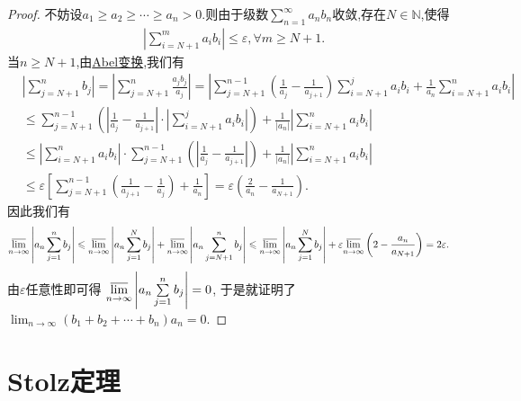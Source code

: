 \documentclass[lang=cn,newtx,10pt,scheme=chinese]{elegantbook}
\begin{document}
\begin{proof}
不妨设\(a_1 \geqslant a_2 \geqslant \cdots \geqslant a_n > 0\).则由于级数\(\sum\limits_{n = 1}^{\infty} a_n b_n\)收敛,存在\(N \in \mathbb{N}\),使得
\begin{align*}
   \left|\sum\limits_{i = N + 1}^{m} a_i b_i\right| \leqslant \varepsilon, \forall m \geqslant N + 1.
\end{align*}
当\(n \geqslant N + 1\),由\hyperref[theorem:Abel变换]{Abel变换},我们有
\begin{align*}
&\left|\sum\limits_{j = N + 1}^{n} b_j\right| = \left|\sum\limits_{j = N + 1}^{n} \frac{a_j b_j}{a_j}\right|
= \left|\sum\limits_{j = N + 1}^{n - 1} \left(\frac{1}{a_j} - \frac{1}{a_{j + 1}}\right) \sum\limits_{i = N + 1}^{j} a_i b_i + \frac{1}{a_n} \sum\limits_{i = N + 1}^{n} a_i b_i\right|
\\
&\leqslant \sum\limits_{j = N + 1}^{n - 1} \left(\left|\frac{1}{a_j} - \frac{1}{a_{j + 1}}\right| \cdot \left|\sum\limits_{i = N + 1}^{j} a_i b_i\right|\right) + \frac{1}{|a_n|} \left|\sum\limits_{i = N + 1}^{n} a_i b_i\right|
\\
&\leqslant \left|\sum\limits_{i = N + 1}^{n} a_i b_i\right|\cdot\sum\limits_{j = N + 1}^{n - 1} \left(\left|\frac{1}{a_j} - \frac{1}{a_{j + 1}}\right| \right) + \frac{1}{|a_n|} \left|\sum\limits_{i = N + 1}^{n} a_i b_i\right|
\\
&\leqslant \varepsilon \left[\sum\limits_{j = N + 1}^{n - 1} \left(\frac{1}{a_{j + 1}} - \frac{1}{a_j}\right) + \frac{1}{a_n}\right]
= \varepsilon \left(\frac{2}{a_n} - \frac{1}{a_{N + 1}}\right).
\end{align*}
因此我们有
\begin{align*}
   &\underset{n\rightarrow \infty}{{\varlimsup }} \left|a_n \sum\limits_{j = 1}^{n} b_j\right| \leqslant \underset{n\rightarrow \infty}{{\varlimsup }} \left|a_n \sum\limits_{j = 1}^{N} b_j\right| + \underset{n\rightarrow \infty}{{\varlimsup }} \left|a_n \sum\limits_{j = N + 1}^{n} b_j\right|
   \leqslant \underset{n\rightarrow \infty}{{\varlimsup }} \left|a_n \sum\limits_{j = 1}^{N} b_j\right| + \varepsilon \underset{n\rightarrow \infty}{{\varlimsup }} \left(2 - \frac{a_n}{a_{N + 1}}\right)= 2\varepsilon.
\end{align*}
由\(\varepsilon\)任意性即可得
\(\underset{n\rightarrow \infty}{{\varlimsup }} \left|a_n \sum\limits_{j = 1}^{n} b_j\right| = 0\),
于是就证明了
\(\lim_{n \to \infty} (b_1 + b_2 + \cdots + b_n)a_n = 0\).
\end{proof}


\section{Stolz定理}
\end{document}
